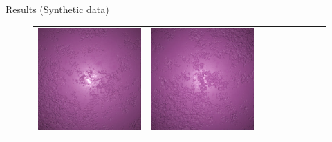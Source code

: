 \documentclass[final]{beamer}
\newlength{\twocolwid}
\newlength{\resultwidth}
\begin{document}
\begin{frame}[t]
\begin{columns}[t]
\begin{column}{\twocolwid}
\begin{block}{Results (Synthetic data)}
\begin{figure}[t]
\begin{tabular}{ccrclcccc}
            		\includegraphics[width=\resultwidth]{synth/plaster/good1.jpg} &
            		\includegraphics[width=\resultwidth]{synth/plaster/good2.jpg} &

\end{tabular}
\end{figure}
\end{block}
\end{column}
\end{columns}
\end{frame}
\end{document}
